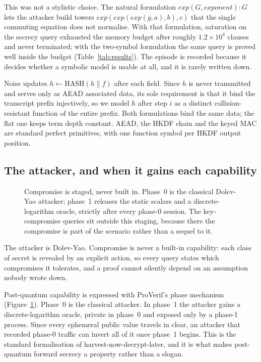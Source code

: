  This was not a stylistic choice. The
natural formulation \(\mathit{exp}(G,\mathit{exponent}):G\) lets the attacker
build towers \(\mathit{exp}(\mathit{exp}(\mathit{exp}(g,a),b),c)\) that the
single commuting equation does not normalise. With that formulation,
saturation on the secrecy query exhausted the memory budget after roughly
\(1.2\times10^4\) clauses and never terminated; with the two-symbol
formulation the same query is proved well inside the budget
(Table~\ref{tab:results}). The episode is recorded because it decides whether
a symbolic model is usable at all, and it is rarely written down.

 Noise updates \(h \leftarrow
\mathrm{HASH}(h \mathbin\| f)\) after each field. Since \(h\) is never
transmitted and serves only as AEAD associated data, its sole requirement is
that it bind the transcript prefix injectively, so we model \(h\) after step
\(i\) as a distinct collision-resistant function of the entire prefix. Both
formulations bind the same data; the flat one keeps term depth constant. AEAD,
the HKDF chain and the keyed MAC are standard perfect primitives, with one
function symbol per HKDF output position.

\subsection{The attacker, and when it gains each capability}

\begin{figure}[t]
\centering
\resizebox{\columnwidth}{!}{}
\caption{Compromise is staged, never built in. Phase~0 is the classical
Dolev-Yao attacker; phase~1 releases the static scalars and a
discrete-logarithm oracle, strictly after every phase-0 session. The
key-compromise queries sit outside this staging, because there the compromise
is part of the scenario rather than a sequel to it.}
\label{fig:compromise}
\end{figure}

The attacker is Dolev-Yao. Compromise is never a built-in capability: each
class of secret is revealed by an explicit action, so every query states which
compromises it tolerates, and a proof cannot silently depend on an assumption
nobody wrote down.

 Post-quantum capability is expressed with
ProVerif's phase mechanism (Figure~\ref{fig:compromise}). Phase~0 is the
classical attacker. In phase~1 the attacker gains a discrete-logarithm oracle,
private in phase~0 and exposed only by a phase-1 process. Since every
ephemeral public value travels in clear, an attacker that recorded phase-0
traffic can invert all of it once phase~1 begins. This is the standard
formalisation of harvest-now-decrypt-later, and it is what makes post-quantum
forward secrecy a property rather than a slogan.

